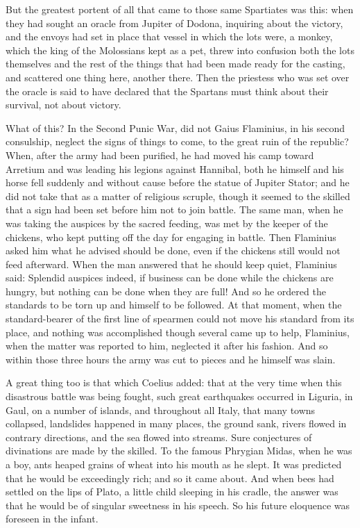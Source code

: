  But the greatest portent of all that came to those same Spartiates was this: when they had sought an oracle from Jupiter of Dodona, inquiring about the victory, and the envoys had set in place that vessel in which the lots were, a monkey, which the king of the Molossians kept as a pet, threw into confusion both the lots themselves and the rest of the things that had been made ready for the casting, and scattered one thing here, another there. Then the priestess who was set over the oracle is said to have declared that the Spartans must think about their survival, not about victory.

 What of this? In the Second Punic War, did not Gaius Flaminius, in his second consulship, neglect the signs of things to come, to the great ruin of the republic? When, after the army had been purified, he had moved his camp toward Arretium and was leading his legions against Hannibal, both he himself and his horse fell suddenly and without cause before the statue of Jupiter Stator; and he did not take that as a matter of religious scruple, though it seemed to the skilled that a sign had been set before him not to join battle. The same man, when he was taking the auspices by the sacred feeding, was met by the keeper of the chickens, who kept putting off the day for engaging in battle. Then Flaminius asked him what he advised should be done, even if the chickens still would not feed afterward. When the man answered that he should keep quiet, Flaminius said: Splendid auspices indeed, if business can be done while the chickens are hungry, but nothing can be done when they are full! And so he ordered the standards to be torn up and himself to be followed. At that moment, when the standard-bearer of the first line of spearmen could not move his standard from its place, and nothing was accomplished though several came up to help, Flaminius, when the matter was reported to him, neglected it after his fashion. And so within those three hours the army was cut to pieces and he himself was slain.

 A great thing too is that which Coelius added: that at the very time when this disastrous battle was being fought, such great earthquakes occurred in Liguria, in Gaul, on a number of islands, and throughout all Italy, that many towns collapsed, landslides happened in many places, the ground sank, rivers flowed in contrary directions, and the sea flowed into streams. Sure conjectures of divinations are made by the skilled. To the famous Phrygian Midas, when he was a boy, ants heaped grains of wheat into his mouth as he slept. It was predicted that he would be exceedingly rich; and so it came about. And when bees had settled on the lips of Plato, a little child sleeping in his cradle, the answer was that he would be of singular sweetness in his speech. So his future eloquence was foreseen in the infant.

